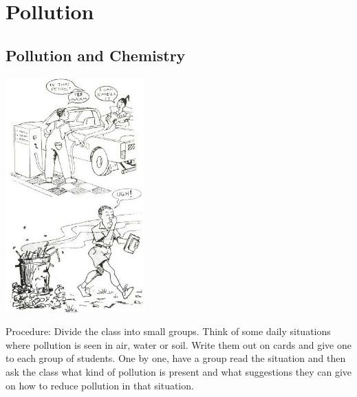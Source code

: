 \section{Pollution} 

\begin{multicols}{2}


\subsection{Pollution and Chemistry}

\begin{center}
\includegraphics[width=0.4\textwidth]{./img/source/air-pollution.jpg}
\end{center}

\begin{description*}
\item[Procedure:]{Divide the class into small groups. Think of some daily situations where pollution is seen in air, water or soil. Write them out on cards and give one to each group of students. One by one, have a group read the situation and then ask the class what kind of pollution is present and what suggestions they can give on how to reduce pollution in that situation.}
\end{description*}


\end{multicols}
